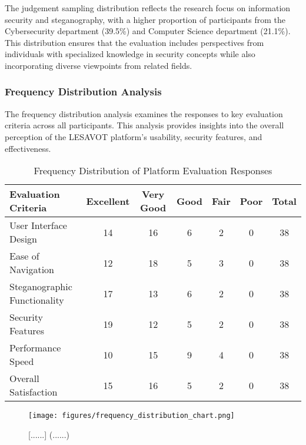 \documentclass[12pt, a4paper, oneside]{book}
\begin{document}
The judgement sampling distribution reflects the research focus on information security and steganography, with a higher proportion of participants from the Cybersecurity department (39.5\%) and Computer Science department (21.1\%). This distribution ensures that the evaluation includes perspectives from individuals with specialized knowledge in security concepts while also incorporating diverse viewpoints from related fields.

\subsubsection{Frequency Distribution Analysis}

The frequency distribution analysis examines the responses to key evaluation criteria across all participants. This analysis provides insights into the overall perception of the LESAVOT platform's usability, security features, and effectiveness.

\begin{table}[htbp]
    \centering
    \caption{Frequency Distribution of Platform Evaluation Responses}
    \begin{tabular}{|l|c|c|c|c|c|c|}
        \hline
        \textbf{Evaluation Criteria} & \textbf{Excellent} & \textbf{Very Good} & \textbf{Good} & \textbf{Fair} & \textbf{Poor} & \textbf{Total} \\
        \hline
        User Interface Design & 14 & 16 & 6 & 2 & 0 & 38 \\
        \hline
        Ease of Navigation & 12 & 18 & 5 & 3 & 0 & 38 \\
        \hline
        Steganographic Functionality & 17 & 13 & 6 & 2 & 0 & 38 \\
        \hline
        Security Features & 19 & 12 & 5 & 2 & 0 & 38 \\
        \hline
        Performance Speed & 10 & 15 & 9 & 4 & 0 & 38 \\
        \hline
        Overall Satisfaction & 15 & 16 & 5 & 2 & 0 & 38 \\
        \hline
    \end{tabular}
    \label{tab:frequency_distribution}
\end{table}

\begin{figure}[htbp]
    \centering
    \texttt{[image: figures/frequency\_distribution\_chart.png]}
    \caption{[......] (......)}
    \label{fig:frequency_distribution_chart}
\end{figure}
\end{document}
